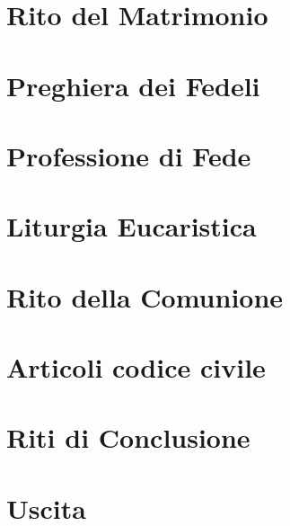 \documentclass[12pt, a4paper]{article}
\begin{document}
\section*{Rito del Matrimonio}


\section*{Preghiera dei Fedeli}


\section*{Professione di Fede}


\section*{Liturgia Eucaristica}


\section*{Rito della Comunione}


\section*{Articoli codice civile}



\section*{Riti di Conclusione}



\section*{Uscita}

\end{document}

